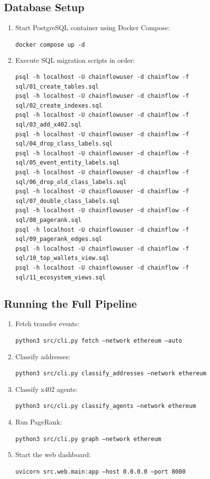 \documentclass[a4paper,12pt]{report}
\begin{document}
\subsection*{Database Setup}
\begin{enumerate}
    \item Start PostgreSQL container using Docker Compose:
    \begin{flushleft}
        \texttt{\small docker compose up -d}
    \end{flushleft}
    \item Execute SQL migration scripts in order:
\begin{verbatim}
psql -h localhost -U chainflowuser -d chainflow -f sql/01_create_tables.sql
psql -h localhost -U chainflowuser -d chainflow -f sql/02_create_indexes.sql
psql -h localhost -U chainflowuser -d chainflow -f sql/03_add_x402.sql
psql -h localhost -U chainflowuser -d chainflow -f sql/04_drop_class_labels.sql
psql -h localhost -U chainflowuser -d chainflow -f sql/05_event_entity_labels.sql
psql -h localhost -U chainflowuser -d chainflow -f sql/06_drop_old_class_labels.sql
psql -h localhost -U chainflowuser -d chainflow -f sql/07_double_class_labels.sql
psql -h localhost -U chainflowuser -d chainflow -f sql/08_pagerank.sql
psql -h localhost -U chainflowuser -d chainflow -f sql/09_pagerank_edges.sql
psql -h localhost -U chainflowuser -d chainflow -f sql/10_top_wallets_view.sql
psql -h localhost -U chainflowuser -d chainflow -f sql/11_ecosystem_views.sql
\end{verbatim}
\end{enumerate}

\subsection*{Running the Full Pipeline}
\begin{enumerate}
    \item Fetch transfer events:
    \begin{flushleft}
        \texttt{\small python3 src/cli.py fetch --network ethereum --auto}
    \end{flushleft}
    \item Classify addresses:
    \begin{flushleft}
        \texttt{\small python3 src/cli.py classify\_addresses --network ethereum}
    \end{flushleft}
    \item Classify x402 agents:
    \begin{flushleft}
        \texttt{\small python3 src/cli.py classify\_agents --network ethereum}
    \end{flushleft}
    \item Run PageRank:
    \begin{flushleft}
        \texttt{\small python3 src/cli.py graph --network ethereum}
    \end{flushleft}
    \item Start the web dashboard:
    \begin{flushleft}
        \texttt{\small uvicorn src.web.main:app --host 0.0.0.0 --port 8000}
    \end{flushleft}
\end{enumerate}
\end{document}
